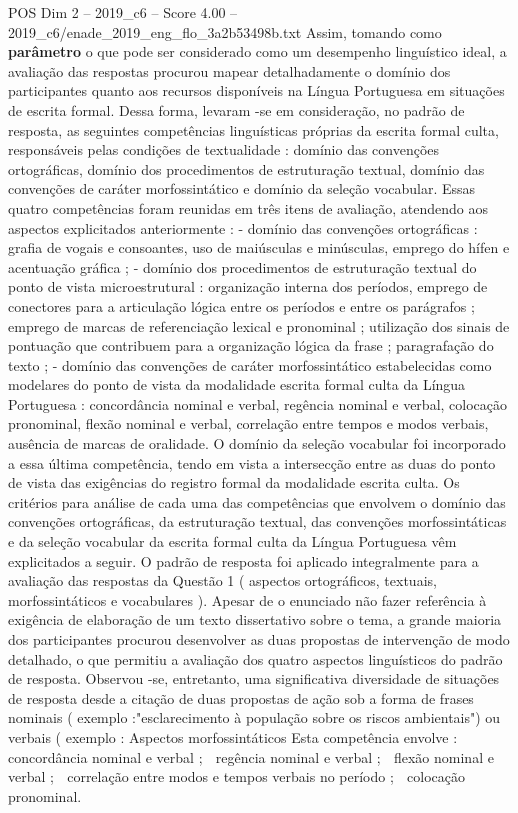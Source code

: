\begin{textsample}{POS Dim 2 – 2019\_c6 – Score 4.00 – 2019\_c6/enade\_2019\_eng\_flo\_3a2b53498b.txt}
Assim, tomando como \textbf{parâmetro} o que pode ser considerado como um desempenho linguístico ideal, a avaliação das respostas procurou mapear detalhadamente o domínio dos participantes quanto aos recursos disponíveis na Língua Portuguesa em situações de escrita formal.
Dessa forma, levaram -se em consideração, no padrão de resposta, as seguintes competências linguísticas próprias da escrita formal culta, responsáveis pelas condições de textualidade : domínio das convenções ortográficas, domínio dos procedimentos de estruturação textual, domínio das convenções de caráter morfossintático e domínio da seleção vocabular.
Essas quatro competências foram reunidas em três itens de avaliação, atendendo aos aspectos explicitados anteriormente : - domínio das convenções ortográficas : grafia de vogais e consoantes, uso de maiúsculas e minúsculas, emprego do hífen e acentuação gráfica ; - domínio dos procedimentos de estruturação textual do ponto de vista microestrutural : organização interna dos períodos, emprego de conectores para a articulação lógica entre os períodos e entre os parágrafos ; emprego de marcas de referenciação lexical e pronominal ; utilização dos sinais de pontuação que contribuem para a organização lógica da frase ; paragrafação do texto ; - domínio das convenções de caráter morfossintático estabelecidas como modelares do ponto de vista da modalidade escrita formal culta da Língua Portuguesa : concordância nominal e verbal, regência nominal e verbal, colocação pronominal, flexão nominal e verbal, correlação entre tempos e modos verbais, ausência de marcas de oralidade.
O domínio da seleção vocabular foi incorporado a essa última competência, tendo em vista a intersecção entre as duas do ponto de vista das exigências do registro formal da modalidade escrita culta.
Os critérios para análise de cada uma das competências que envolvem o domínio das convenções ortográficas, da estruturação textual, das convenções morfossintáticas e da seleção vocabular da escrita formal culta da Língua Portuguesa vêm explicitados a seguir.
O padrão de resposta foi aplicado integralmente para a avaliação das respostas da Questão 1 ( aspectos ortográficos, textuais, morfossintáticos e vocabulares ).
Apesar de o enunciado não fazer referência à exigência de elaboração de um texto dissertativo sobre o tema, a grande maioria dos participantes procurou desenvolver as duas propostas de intervenção de modo detalhado, o que permitiu a avaliação dos quatro aspectos linguísticos do padrão de resposta.
Observou -se, entretanto, uma significativa diversidade de situações de resposta desde a citação de duas propostas de ação sob a forma de frases nominais ( exemplo :"esclarecimento à população sobre os riscos ambientais") ou verbais ( exemplo : Aspectos morfossintáticos Esta competência envolve :  concordância nominal e verbal ;  regência nominal e verbal ;  flexão nominal e verbal ;  correlação entre modos e tempos verbais no período ;  colocação pronominal.

\end{textsample}
